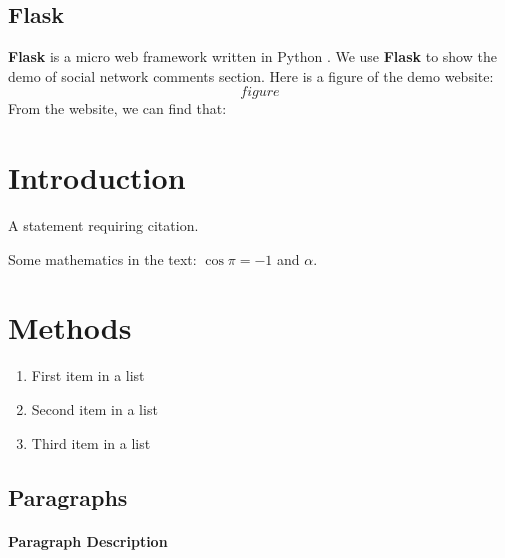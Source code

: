 \documentclass[
12pt, %
a4paper, %
oneside, %
headinclude,footinclude, %
BCOR5mm, %
]{scrartcl}
\begin{document}
\subsection{Flask}
\textbf{Flask} is a micro web framework written in Python 
\cite{grinberg2018flask}. We use \textbf{Flask} to show the demo of social network comments section. Here is a figure of the demo website:
\begin{equation}
    figure
\end{equation}
From the website, we can find that:

\section{Introduction}

A statement requiring citation.

\lipsum[1-3] %

Some mathematics in the text: $\cos\pi=-1$ and $\alpha$.
 

\section{Methods}

\lipsum[5] %

\begin{enumerate}[noitemsep] %
\item First item in a list
\item Second item in a list
\item Third item in a list
\end{enumerate}


\subsection{Paragraphs}

\lipsum[6] %

\paragraph{Paragraph Description} \lipsum[7] %
\end{document}
